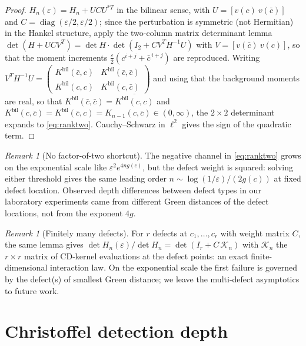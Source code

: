 \documentclass[11pt]{amsart}
\theoremstyle{definition}
\theoremstyle{remark}
\newtheorem{remark}[theorem]{Remark}
\newcommand{\eps}{\varepsilon}
\begin{document}
\begin{proof}
$H_n(\eps)=H_n+U C U^{*T}$ in the bilinear sense, with
$U=[v(c)\ v(\bar c)]$ and $C=\operatorname{diag}(\eps/2,\eps/2)$; since the
perturbation is symmetric (not Hermitian) in the Hankel structure, apply the
two-column matrix determinant lemma
$\det(H+U C V^{T})=\det H\cdot\det(I_2+C V^{T}H^{-1}U)$ with
$V=[v(\bar c)\ v(c)]$, so that the moment increments
$\tfrac\eps2(c^{i+j}+\bar c^{\,i+j})$ are reproduced. Writing
$V^{T}H^{-1}U=\begin{pmatrix}K^{\mathrm{bil}}(\bar c,c)&
K^{\mathrm{bil}}(\bar c,\bar c)\\K^{\mathrm{bil}}(c,c)&
K^{\mathrm{bil}}(c,\bar c)\end{pmatrix}$ and using that the background
moments are real, so that
$K^{\mathrm{bil}}(\bar c,\bar c)=\overline{K^{\mathrm{bil}}(c,c)}$ and
$K^{\mathrm{bil}}(c,\bar c)=K^{\mathrm{bil}}(\bar c,c)
=K_{n-1}(c,\bar c)\in(0,\infty)$, the $2\times2$ determinant expands to
\eqref{eq:ranktwo}. Cauchy--Schwarz in $\ell^2$ gives the sign of the
quadratic term.
\end{proof}

\begin{remark}[No factor-of-two shortcut]\label{rem:nofactor2}
The negative channel in \eqref{eq:ranktwo} grows on the exponential scale
like $\eps^2e^{4ng(c)}$, but the defect weight is squared: solving either
threshold gives the same leading order $n\sim\log(1/\eps)/(2g(c))$ at fixed
defect location. Observed depth differences between defect types in our
laboratory experiments came from different Green distances of the defect
locations, not from the exponent $4g$.
\end{remark}

\begin{remark}[Finitely many defects]\label{rem:multidefect}
For $r$ defects at $c_1,\dots,c_r$ with weight matrix $C$, the same lemma
gives $\det H_n(\eps)/\det H_n=\det(I_r+C\,\mathcal K_n)$ with
$\mathcal K_n$ the $r\times r$ matrix of CD-kernel evaluations at the defect
points: an exact finite-dimensional interaction law. On the exponential
scale the first failure is governed by the defect(s) of smallest Green
distance; we leave the multi-defect asymptotics to future work.
\end{remark}

\section{Christoffel detection depth}\label{sec:depth}
\end{document}
